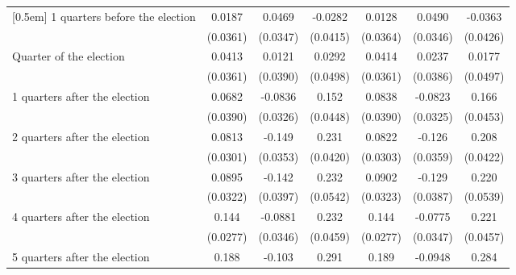 \begin{table}[!ht]
\begin{tabular}{l*{6}{c}}
[0.5em]
 1 quarters before the election&      0.0187         &      0.0469         &     -0.0282         &      0.0128         &      0.0490         &     -0.0363         \\
                    &    (0.0361)         &    (0.0347)         &    (0.0415)         &    (0.0364)         &    (0.0346)         &    (0.0426)         \\
[0.5em]
Quarter of the election&      0.0413         &      0.0121         &      0.0292         &      0.0414         &      0.0237         &      0.0177         \\
                    &    (0.0361)         &    (0.0390)         &    (0.0498)         &    (0.0361)         &    (0.0386)         &    (0.0497)         \\
[0.5em]
 1 quarters after the election&      0.0682         &     -0.0836\sym{*}  &       0.152\sym{***}&      0.0838\sym{*}  &     -0.0823\sym{*}  &       0.166\sym{***}\\
                    &    (0.0390)         &    (0.0326)         &    (0.0448)         &    (0.0390)         &    (0.0325)         &    (0.0453)         \\
[0.5em]
 2 quarters after the election&      0.0813\sym{**} &      -0.149\sym{***}&       0.231\sym{***}&      0.0822\sym{**} &      -0.126\sym{***}&       0.208\sym{***}\\
                    &    (0.0301)         &    (0.0353)         &    (0.0420)         &    (0.0303)         &    (0.0359)         &    (0.0422)         \\
[0.5em]
 3 quarters after the election&      0.0895\sym{**} &      -0.142\sym{***}&       0.232\sym{***}&      0.0902\sym{**} &      -0.129\sym{***}&       0.220\sym{***}\\
                    &    (0.0322)         &    (0.0397)         &    (0.0542)         &    (0.0323)         &    (0.0387)         &    (0.0539)         \\
[0.5em]
 4 quarters after the election&       0.144\sym{***}&     -0.0881\sym{*}  &       0.232\sym{***}&       0.144\sym{***}&     -0.0775\sym{*}  &       0.221\sym{***}\\
                    &    (0.0277)         &    (0.0346)         &    (0.0459)         &    (0.0277)         &    (0.0347)         &    (0.0457)         \\
[0.5em]
 5 quarters after the election&       0.188\sym{***}&      -0.103\sym{**} &       0.291\sym{***}&       0.189\sym{***}&     -0.0948\sym{**} &       0.284\sym{***}\\

\end{tabular}
\end{table}
